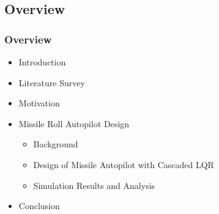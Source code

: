 \documentclass[10pt]{beamer}
\begin{document}
\subsection{ Overview}
\begin{frame}
\frametitle{Overview}
\renewcommand{\baselinestretch}{1}
\begin{itemize}
\item Introduction \bigskip
\item Literature Survey \bigskip
\item Motivation \bigskip
\item Missile Roll Autopilot Design \bigskip
\begin{itemize}
 \item Background \smallskip
 \item Design of Missile Autopilot with Cascaded LQR \smallskip
  \item Simulation Results and Analysis \bigskip
 \end{itemize}
 \item Conclusion \bigskip
\end{itemize}
\end{frame}

\end{document}
